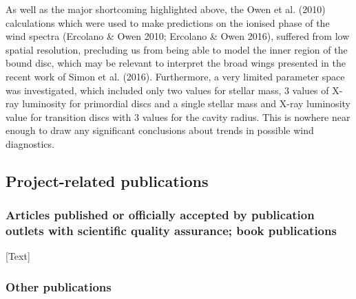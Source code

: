 \documentclass[10pt,fleqn,twoside]{article}
\newcommand{\Tcol}{\color{blue}}
\begin{document}
As well as the major shortcoming highlighted above, the Owen et
al. (2010) calculations which were used to make predictions on
the ionised phase of the wind spectra (Ercolano \& Owen 2010;
Ercolano \& Owen 2016), suffered from low spatial resolution,
precluding us from being able to model the inner region of the bound disc, which
may be relevant to interpret the broad wings presented in the recent
work of Simon et al. (2016). Furthermore, a very limited
parameter space was investigated, which included only two values for
stellar mass, 3 values of X-ray luminosity for primordial discs and a
single stellar mass and X-ray luminosity value for transition discs
with 3 values for the cavity radius. This is nowhere near enough to draw any
significant conclusions about trends in possible wind diagnostics. 



\subsection{\Tcol Project-related publications}


\subsubsection{\Tcol 
Articles published or officially accepted by publication outlets with scientific quality assurance;
book publications}

[Text]

\subsubsection{\Tcol Other publications}
\end{document}
